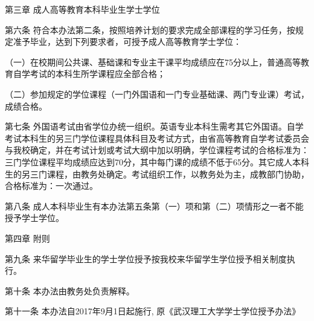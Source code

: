 \documentclass[UTF8,12pt,a4paper]{report}
\begin{document}
第三章 成人高等教育本科毕业生学士学位

第六条  符合本办法第二条，按照培养计划的要求完成全部课程的学习任务，按规定准予毕业，达到下列要求者，可授予成人高等教育学士学位：

（一）在校期间公共课、基础课和专业主干课平均成绩应在75分以上，普通高等教育自学考试的本科生所学课程应全部合格；

（二）参加规定的学位课程（一门外国语和一门专业基础课、两门专业课）考试，成绩合格。

第七条  外国语考试由省学位办统一组织。英语专业本科生需考其它外国语。自学考试本科生的另三门学位课程具体科目及考试方式，由省高等教育自学考试委员会与我校确定，并在考试计划或考试大纲中加以明确，学位课程考试的合格标准为：三门学位课程平均成绩应达到70分，其中每门课的成绩不低于65分。其它成人本科生的另三门课程，由教务处确定。考试组织工作，以教务处为主，成教部门协助，合格标准为：一次通过。

第八条  成人本科毕业生有本办法第五条第（一）项和第（二）项情形之一者不能授予学士学位。



第四章 附则

第九条  来华留学毕业生的学士学位授予按我校来华留学生学位授予相关制度执行。

第十条  本办法由教务处负责解释。

第十一条  本办法自2017年9月1日起施行, 原《武汉理工大学学士学位授予办法》

\part{}
\chapter{}
\end{document}
